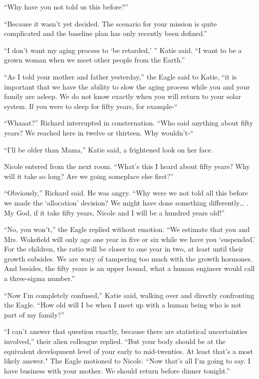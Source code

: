 \documentclass[]{article}
\begin{document}
{“Why have you not told us this before?”

“Because it wasn’t yet decided.  The scenario for your mission is quite complicated and the baseline plan has only recently been defined.”

“I don’t want my aging process to ‘be retarded,’ ” Katie said.  “I want to be a grown woman when we meet other people from the Earth.”

“As I told your mother and father yesterday,” the Eagle said to Katie, “it is important that we have the ability to slow the aging process while you and your family are asleep.  We do not know exactly when you will return to your solar system.  If you were to sleep for fifty years, for example-“

“Whaaat?” Richard interrupted in consternation.  “Who said anything about fifty years? We reached here in twelve or thirteen.  Why wouldn’t-“

“I’ll be older than Mama,” Katie said, a frightened look on her face.

Nicole entered from the next room.  “What’s this I heard about fifty years? Why will it take so long? Are we going someplace else first?”

“Obviously,” Richard said.  He was angry.  “Why were we not told all this before we made the ‘allocation’ decision? We might have done something differently… .  My God, if it take fifty years, Nicole and I will be a hundred years old!”

“No, you won’t,” the Eagle replied without emotion.  “We estimate that you and Mrs.  Wakefield will only age one year in five or six while we have you ‘suspended.’ For the children, the ratio will be closer to one year in two, at least until their growth subsides.  We are wary of tampering too much with the growth hormones.  And besides, the fifty years is an upper bound, what a human engineer would call a three-sigma number.”

“Now I’m completely confused,” Katie said, walking over and directly confronting the Eagle.  “How old will I be when I meet up with a human being who is not part of my family?”

“I can’t answer that question exactly, because there are statistical uncertainties involved,” their alien colleague replied.  “But your body should be at the equivalent development level of your early to mid-twenties.  At least that’s a most likely answer."  The Eagle motioned to Nicole.  “Now that’s all I’m going to say.  I have business with your mother.  We should return before dinner tonight.”

}
\end{document}
